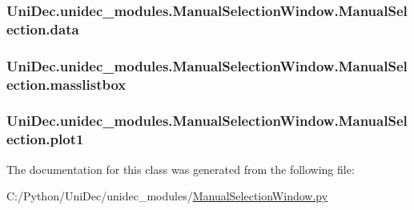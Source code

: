 \subsubsection[{data}]{\setlength{\rightskip}{0pt plus 5cm}Uni\+Dec.\+unidec\+\_\+modules.\+Manual\+Selection\+Window.\+Manual\+Selection.\+data}\label{class_uni_dec_1_1unidec__modules_1_1_manual_selection_window_1_1_manual_selection_a17b6e3c84eca21572460b880f5d7fb39}
\hypertarget{class_uni_dec_1_1unidec__modules_1_1_manual_selection_window_1_1_manual_selection_a4c5c02e2ac89a24ce6c9d34ff7d19fa0}{}
\subsubsection[{masslistbox}]{\setlength{\rightskip}{0pt plus 5cm}Uni\+Dec.\+unidec\+\_\+modules.\+Manual\+Selection\+Window.\+Manual\+Selection.\+masslistbox}\label{class_uni_dec_1_1unidec__modules_1_1_manual_selection_window_1_1_manual_selection_a4c5c02e2ac89a24ce6c9d34ff7d19fa0}
\hypertarget{class_uni_dec_1_1unidec__modules_1_1_manual_selection_window_1_1_manual_selection_a84d3c259dff66baf9a2ab4d43c0e8d0c}{}
\subsubsection[{plot1}]{\setlength{\rightskip}{0pt plus 5cm}Uni\+Dec.\+unidec\+\_\+modules.\+Manual\+Selection\+Window.\+Manual\+Selection.\+plot1}\label{class_uni_dec_1_1unidec__modules_1_1_manual_selection_window_1_1_manual_selection_a84d3c259dff66baf9a2ab4d43c0e8d0c}


The documentation for this class was generated from the following file\+:\begin{DoxyCompactItemize}
\item 
C\+:/\+Python/\+Uni\+Dec/unidec\+\_\+modules/\hyperlink{_manual_selection_window_8py}{Manual\+Selection\+Window.\+py}\end{DoxyCompactItemize}
